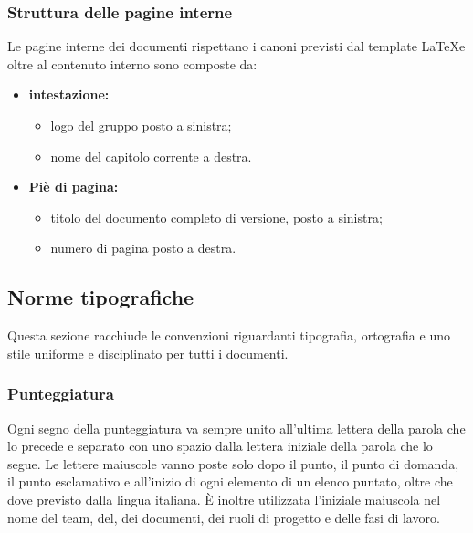 \subsubsection{Struttura delle pagine interne}
Le pagine interne dei documenti rispettano i canoni previsti dal template \LaTeX e oltre al contenuto interno sono composte da: \\

\begin{itemize}
	\item \textbf{intestazione:}
	\begin{itemize}
		\item logo del gruppo posto a sinistra;
		\item nome del capitolo corrente a destra. 
	\end{itemize}
	\item \textbf {Piè di pagina:}
	\begin{itemize}
	\item titolo del documento completo di versione, posto a sinistra;
	\item numero di pagina posto a destra.
	\end{itemize}

\end{itemize} 
\subsection{Norme tipografiche}
Questa sezione racchiude le convenzioni riguardanti tipografia, ortografia e uno stile uniforme e disciplinato per tutti i documenti.
\subsubsection{Punteggiatura}
Ogni segno della punteggiatura va sempre unito all'ultima lettera della parola che lo precede e separato con uno spazio dalla lettera iniziale della parola che lo segue.
Le lettere maiuscole vanno poste solo dopo il punto, il punto di domanda, il punto esclamativo e all’inizio di ogni elemento di un elenco puntato, oltre che dove previsto dalla lingua italiana. È inoltre utilizzata l’iniziale maiuscola nel nome del team, del, dei documenti, dei ruoli di progetto e delle fasi di lavoro.
